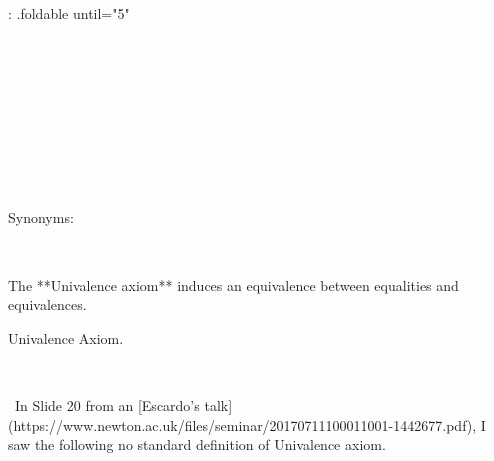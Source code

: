 {: .foldable until="5"}
\begin{code}%
\>[0][@{}l@{\AgdaIndent{1}}]%
\>[2]\<%
\\
%
\>[2]\<%
\\
\>[2][@{}l@{\AgdaIndent{0}}]%
\>[4]\AgdaSymbol{:}\AgdaSpace{}%
\AgdaSpace{}%
\AgdaOperator{\AgdaDatatype{==}}\AgdaSpace{}%
\<%
\\
%
\>[4]\AgdaComment{--------}\<%
\\
%
\>[4]\AgdaSpace{}%
\AgdaSpace{}%
\AgdaSpace{}%
\<%
\\
%
\\[\AgdaEmptyExtraSkip]%
%
\>[2]\AgdaSpace{}%
\AgdaSpace{}%
\AgdaSymbol{=}\AgdaSpace{}%
\<%
\\
\>[2][@{}l@{\AgdaIndent{0}}]%
\>[4]\AgdaSymbol{(}\AgdaSpace{}%
\AgdaSpace{}%
\AgdaSpace{}%
\AgdaSpace{}%
\AgdaSymbol{)}\AgdaSpace{}%
\AgdaSymbol{)}\<%
\\
%
\>[4]\AgdaSymbol{(}\AgdaSpace{}%
\AgdaSpace{}%
\AgdaSpace{}%
\AgdaSpace{}%
\AgdaSymbol{)}\AgdaSpace{}%
\AgdaSymbol{(}\AgdaSpace{}%
\AgdaSymbol{)}\AgdaSpace{}%
\AgdaOperator{\AgdaInductiveConstructor{,}}\AgdaSpace{}%
\AgdaSymbol{(}\AgdaSpace{}%
\AgdaSpace{}%
\AgdaOperator{\AgdaInductiveConstructor{,}}\AgdaSpace{}%
\AgdaSpace{}%
\AgdaSymbol{))}\<%
\end{code}

Synonyms:

\begin{code}%
%
\>[2]\AgdaSpace{}%
\AgdaSymbol{=}\AgdaSpace{}%
\<%
\\
%
\>[2]%
\>[10]\AgdaSymbol{=}\AgdaSpace{}%
\<%
\end{code}

The **Univalence axiom** induces an equivalence between equalities
and equivalences.

Univalence Axiom.

\begin{code}%
%
\>[2]\<%
\\
\>[2][@{}l@{\AgdaIndent{0}}]%
\>[4]\AgdaSpace{}%
\AgdaSymbol{:}\AgdaSpace{}%
\AgdaSpace{}%
\<%
\end{code}
\
In Slide 20 from an [Escardo's talk](https://www.newton.ac.uk/files/seminar/20170711100011001-1442677.pdf), I saw
the following no standard definition of Univalence axiom.

